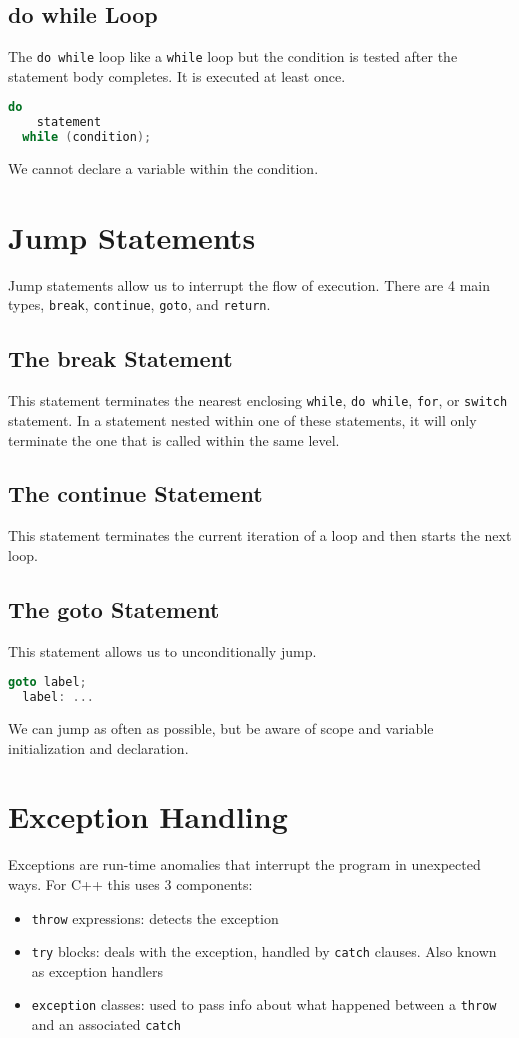 \documentclass[12pt, a4paper]{report}
\begin{document}
\subsection{do while Loop}
The \verb|do while| loop like a \verb|while| loop but the condition is tested after the statement body completes.
It is executed at least once.
\begin{lstlisting}[language=C++]
  do
    statement
  while (condition);
\end{lstlisting}
We cannot declare a variable within the condition.
\section{Jump Statements}
Jump statements allow us to interrupt the flow of execution.
There are 4 main types, \verb|break|, \verb|continue|, \verb|goto|, and \verb|return|.

\subsection{The break Statement}
This statement terminates the nearest enclosing \verb|while|, \verb|do while|, \verb|for|, or \verb|switch| statement.
In a statement nested within one of these statements, it will only terminate the one that is called within the same level.
\subsection{The continue Statement}
This statement terminates the current iteration of a loop and then starts the next loop.
\subsection{The goto Statement}
This statement allows us to unconditionally jump.
\begin{lstlisting}[language=C++]
  goto label;
  label: ...
\end{lstlisting}
We can jump as often as possible, but be aware of scope and variable initialization and declaration.
\section{Exception Handling}
Exceptions are run-time anomalies that interrupt the program in unexpected ways.
For C++ this uses 3 components:
\begin{itemize}
\item \verb|throw| expressions: detects the exception
\item \verb|try| blocks: deals with the exception, handled by \verb|catch| clauses. Also known as exception handlers
\item \verb|exception| classes: used to pass info about what happened between a \verb|throw| and an associated \verb|catch|
\end{itemize}
\end{document}
